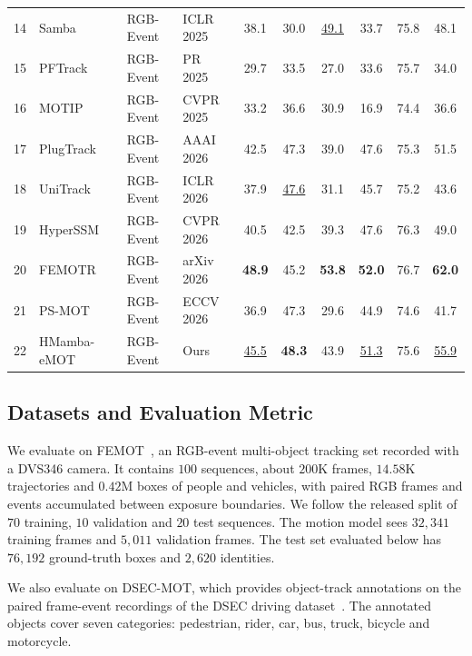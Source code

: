 \documentclass[10pt,twocolumn,letterpaper]{article}
\begin{document}
\begin{table}
\begin{tabular}{clllcccccc}
    14 & Samba~\cite{segu2025samba} & RGB-Event & ICLR 2025 & 38.1 & 30.0 & \underline{49.1} & 33.7 & 75.8 & 48.1 \\
    15 & PFTrack~\cite{zhu2025pftrack} & RGB-Event & PR 2025 & 29.7 & 33.5 & 27.0 & 33.6 & 75.7 & 34.0 \\
    16 & MOTIP~\cite{gao2025motip} & RGB-Event & CVPR 2025 & 33.2 & 36.6 & 30.9 & 16.9 & 74.4 & 36.6 \\
    17 & PlugTrack~\cite{kim2026plugtrack} & RGB-Event & AAAI 2026 & 42.5 & 47.3 & 39.0 & 47.6 & 75.3 & 51.5 \\
    18 & UniTrack~\cite{galoa2026unitrack} & RGB-Event & ICLR 2026 & 37.9 & \underline{47.6} & 31.1 & 45.7 & 75.2 & 43.6 \\
    19 & HyperSSM~\cite{song2026hyperssm} & RGB-Event & CVPR 2026 & 40.5 & 42.5 & 39.3 & 47.6 & 76.3 & 49.0 \\
    20 & FEMOTR~\cite{wang2026femot} & RGB-Event & arXiv 2026 & \textbf{48.9} & 45.2 & \textbf{53.8} & \textbf{52.0} & 76.7 & \textbf{62.0} \\
    21 & PS-MOT~\cite{luo2026psmot} & RGB-Event & ECCV 2026 & 36.9 & 47.3 & 29.6 & 44.9 & 74.6 & 41.7 \\
    \rowcolor{oursrow}
    22 & HMamba-eMOT & RGB-Event & Ours & \underline{45.5} & \textbf{48.3} & 43.9 & \underline{51.3} & 75.6 & \underline{55.9} \\
    \bottomrule
  \end{tabular}
\end{table} 

\subsection{Datasets and Evaluation Metric}

We evaluate on FEMOT~\cite{wang2026femot}, an RGB-event multi-object tracking set recorded with a DVS346 camera. It contains $100$ sequences, about $200$K frames, $14.58$K trajectories and $0.42$M boxes of people and vehicles, with paired RGB frames and events accumulated between exposure boundaries. We follow the released split of $70$ training, $10$ validation and $20$ test sequences. The motion model sees $32{,}341$ training frames and $5{,}011$ validation frames. The test set evaluated below has $76{,}192$ ground-truth boxes and $2{,}620$ identities. 


We also evaluate on DSEC-MOT, which provides object-track annotations on the paired frame-event recordings of the DSEC driving dataset~\cite{gehrig2021dsec}. The annotated objects cover seven categories: pedestrian, rider, car, bus, truck, bicycle and motorcycle.
\end{document}
